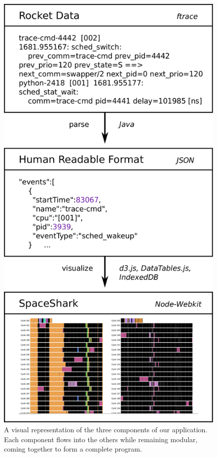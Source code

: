 \documentclass{hmcclinic}
\begin{document}
  \begin{figure}[H]
    \begin{center}
  \includegraphics[scale=0.15]{architecture_diagram.png}
  \caption{A visual representation of the three components of our application. Each
  component flows into the others while remaining modular, coming together to form a complete program.}
\end{center}
\end{figure}
\end{document}
